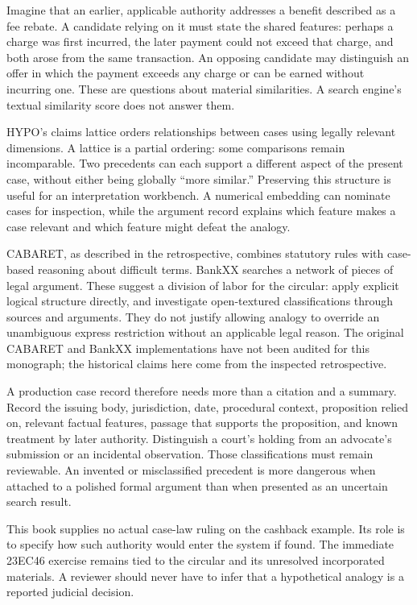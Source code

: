 \documentclass[12pt,a4paper,oneside,openany]{book}
\begin{document}
Imagine that an earlier, applicable authority addresses a benefit described as a
fee rebate. A candidate relying on it must state the shared features: perhaps a
charge was first incurred, the later payment could not exceed that charge, and
both arose from the same transaction. An opposing candidate may distinguish an
offer in which the payment exceeds any charge or can be earned without incurring
one. These are questions about material similarities. A search engine's textual
similarity score does not answer them.

HYPO's claims lattice orders relationships between cases using legally relevant
dimensions. A lattice is a partial ordering: some comparisons remain
incomparable. Two precedents can each support a different aspect of the present
case, without either being globally ``more similar.'' Preserving this structure
is useful for an interpretation workbench. A numerical embedding can nominate
cases for inspection, while the argument record explains which feature makes a
case relevant and which feature might defeat the analogy.

CABARET, as described in the retrospective, combines statutory rules with
case-based reasoning about difficult terms. BankXX searches a network of pieces
of legal argument. These suggest a division of labor for the circular: apply
explicit logical structure directly, and investigate open-textured classifications
through sources and arguments. They do not justify allowing analogy to override
an unambiguous express restriction without an applicable legal reason. The
original CABARET and BankXX implementations have not been audited for this
monograph; the historical claims here come from the inspected retrospective.

A production case record therefore needs more than a citation and a summary.
Record the issuing body, jurisdiction, date, procedural context, proposition
relied on, relevant factual features, passage that supports the proposition, and
known treatment by later authority. Distinguish a court's holding from an
advocate's submission or an incidental observation. Those classifications must
remain reviewable. An invented or misclassified precedent is more dangerous when
attached to a polished formal argument than when presented as an uncertain search
result.

This book supplies no actual case-law ruling on the cashback example. Its role is
to specify how such authority would enter the system if found. The immediate
23EC46 exercise remains tied to the circular and its unresolved incorporated
materials. A reviewer should never have to infer that a hypothetical analogy is
a reported judicial decision.
\end{document}
